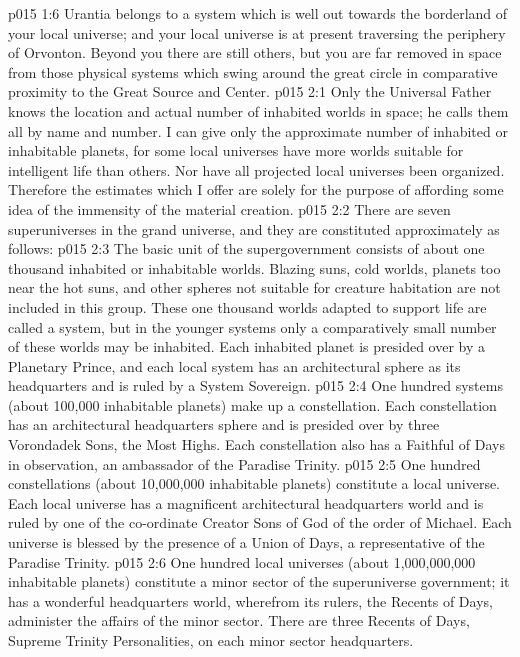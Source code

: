 \vs p015 1:6 Urantia belongs to a system which is well out towards the borderland of your local universe; and your local universe is at present traversing the periphery of Orvonton. Beyond you there are still others, but you are far removed in space from those physical systems which swing around the great circle in comparative proximity to the Great Source and Center.
\vs p015 2:1 Only the Universal Father knows the location and actual number of inhabited worlds in space; he calls them all by name and number. I can give only the approximate number of inhabited or inhabitable planets, for some local universes have more worlds suitable for intelligent life than others. Nor have all projected local universes been organized. Therefore the estimates which I offer are solely for the purpose of affording some idea of the immensity of the material creation.
\vs p015 2:2 \pc There are seven superuniverses in the grand universe, and they are constituted approximately as follows:
\vs p015 2:3 \pc {}\bibnobreakspace {} The basic unit of the supergovernment consists of about one thousand inhabited or inhabitable worlds. Blazing suns, cold worlds, planets too near the hot suns, and other spheres not suitable for creature habitation are not included in this group. These one thousand worlds adapted to support life are called a system, but in the younger systems only a comparatively small number of these worlds may be inhabited. Each inhabited planet is presided over by a Planetary Prince, and each local system has an architectural sphere as its headquarters and is ruled by a System Sovereign.
\vs p015 2:4 \pc {}\bibnobreakspace {} One hundred systems (about 100,000 inhabitable planets) make up a constellation. Each constellation has an architectural headquarters sphere and is presided over by three Vorondadek Sons, the Most Highs. Each constellation also has a Faithful of Days in observation, an ambassador of the Paradise Trinity.
\vs p015 2:5 \pc {}\bibnobreakspace {} One hundred constellations (about 10,000,000 inhabitable planets) constitute a local universe. Each local universe has a magnificent architectural headquarters world and is ruled by one of the co\hyp{}ordinate Creator Sons of God of the order of Michael. Each universe is blessed by the presence of a Union of Days, a representative of the Paradise Trinity.
\vs p015 2:6 \pc {}\bibnobreakspace {} One hundred local universes (about 1,000,000,000 inhabitable planets) constitute a minor sector of the superuniverse government; it has a wonderful headquarters world, wherefrom its rulers, the Recents of Days, administer the affairs of the minor sector. There are three Recents of Days, Supreme Trinity Personalities, on each minor sector headquarters.
